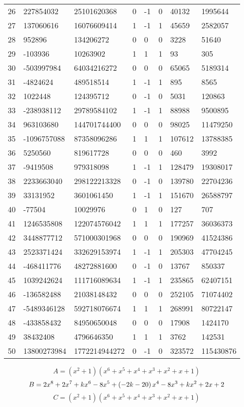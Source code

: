 \documentclass{amsart}
\begin{document}
\begin{longtable}{|l|l|l|lllll|}
26&227854032&25101620368&0&-1&0&40132&1995644\\
27&137060616&16076609414&1&-1&1&45659&2582057\\
28&952896&134206272&0&0&0&3228&51640\\
29&-103936&10263902&1&1&1&93&305\\
30&-503997984&64034216272&0&0&0&65065&5189314\\
31&-4824624&489518514&1&-1&1&895&8565\\
32&1022448&124395712&0&-1&0&5031&120863\\
33&-238938112&29789584102&1&-1&1&88988&9500895\\
34&963103680&144701744400&0&0&0&98025&11479250\\
35&-1096757088&87358096286&1&1&1&107612&13788385\\
36&5250560&819617728&0&0&0&460&3992\\
37&-9419508&979318098&1&-1&1&128479&19308017\\
38&2233663040&298122213328&0&-1&0&139780&22704236\\
39&33131952&3601061450&1&-1&1&151670&26588797\\
40&-77504&10029976&0&1&0&127&707\\
41&1246535808&122074576042&1&1&1&177257&36036373\\
42&3448877712&571000301968&0&0&0&190969&41524386\\
43&2523371424&332629153974&1&-1&1&205303&47704245\\
44&-468411776&48272881600&0&-1&0&13767&850337\\
45&1039242624&111716089634&1&-1&1&235865&62407151\\
46&-136582488&21038148432&0&0&0&252105&71074402\\
47&-5489346128&592718076674&1&1&1&268991&80722147\\
48&-433858432&84950650048&0&0&0&17908&1424170\\
49&38432408&4796646350&1&1&1&3762&142531\\
50&13800273984&1772214944272&0&-1&0&323572&115430876\\
\hline
\end{longtable}
$$A=(x^2
 + 1)(x^6
 + x^5
 + x^4
 + x^3
 + x^2
 + x
 + 1)$$
$$B=2\*x^8
 + 2\*x^7
 + k\*x^6
 - 8\*x^5
 + \left(-2\*k
 - 20\right) \*x^4
 - 8\*x^3
 + k\*x^2
 + 2\*x
 + 2$$
$$C=(x^2
 + 1)(x^6
 + x^5
 + x^4
 + x^3
 + x^2
 + x
 + 1)$$
\end{document}
